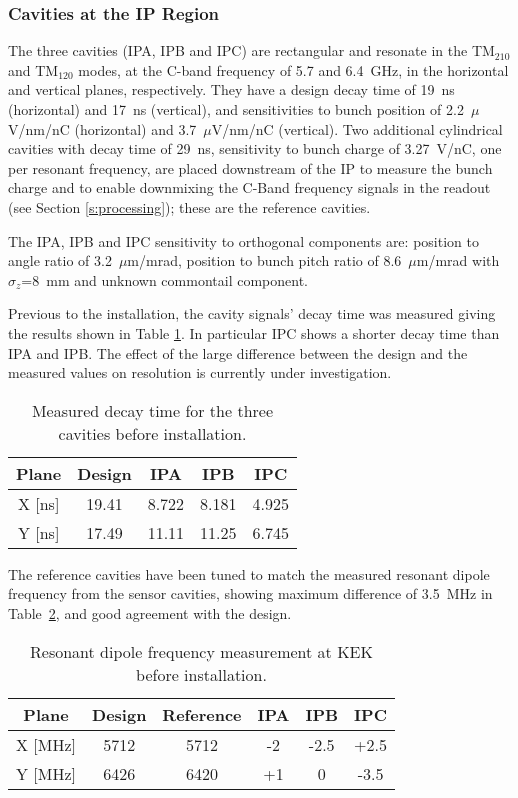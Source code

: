 \subsubsection{Cavities at the IP Region}\label{s:IPBPMsignals}
The three cavities (IPA, IPB and IPC) are rectangular and resonate in the TM$_{210}$ and TM$_{120}$ modes, at the C-band frequency of 5.7 and 6.4~GHz, in the horizontal and vertical planes, respectively. They have a design decay time of 19~ns (horizontal) and 17~ns (vertical), and sensitivities to bunch position of 2.2~$\mu$V/nm/nC (horizontal) and 3.7~$\mu$V/nm/nC (vertical). Two additional cylindrical cavities with decay time of 29~ns, sensitivity to bunch charge of 3.27~V/nC, one per resonant frequency, are placed downstream of the IP to measure the bunch charge and to enable downmixing the C-Band frequency signals in the readout (see Section \ref{s:processing}); these are the reference cavities.\par
The IPA, IPB and IPC sensitivity to orthogonal components are: position to angle ratio of 3.2~$\mu$m/mrad, position to bunch pitch ratio of 8.6~$\mu$m/mrad with $\sigma_z$=8~mm and unknown commontail component.\par
Previous to the installation, the cavity signals' decay time was measured giving the results shown in Table \ref{t:decayt}. In particular IPC shows a shorter decay time than IPA and IPB. The effect of the large difference between the design and the measured values on resolution is currently under investigation.\par
\begin{table}[h]
\centering
\begin{tabular}{c|c||c|c|c}\hline
 Plane & Design & IPA & IPB & IPC \\\hline\hline
  X [ns] & 19.41 & 8.722 & 8.181 & 4.925\\
  Y [ns] & 17.49 & 11.11 & 11.25 & 6.745\\\hline
\end{tabular}\caption{Measured decay time for the three cavities before installation.}\label{t:decayt}
\end{table}
The reference cavities have been tuned to match the measured resonant dipole frequency from the sensor cavities, showing maximum difference of 3.5~MHz in Table~\ref{t:dipolefreq}, and good agreement with the design. 
\begin{table}[h]
\centering
\begin{tabular}{c|c||c|c|c|c}\hline
 Plane & Design & Reference & IPA & IPB & IPC \\\hline\hline
  X [MHz] & 5712 & 5712 & -2 & -2.5 & +2.5\\
  Y [MHz] & 6426 & 6420 & +1 & 0 & -3.5\\\hline
\end{tabular}\caption{Resonant dipole frequency measurement at KEK before installation.}\label{t:dipolefreq}
\end{table}


